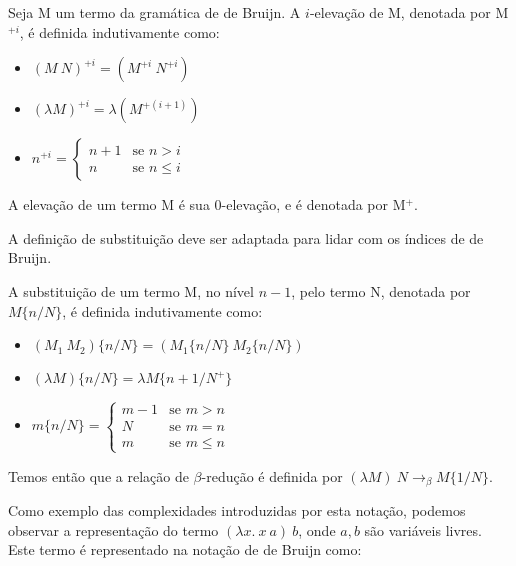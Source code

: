 \begin{definicao}[$i$-elevação] Seja M um termo da gramática de de Bruijn. A
    $i$-elevação de M, denotada por M$^{+i}$, é definida indutivamente como:
    \begin{itemize}
        \item $(M\ N)^{+i} = (M^{+i}\ N^{+i})$
        \item $(\lambda M)^{+i} = \lambda (M^{+(i+1)})$
        \item $n^{+i} = \begin{cases}
                            n + 1   & \text{se } n > i \\
                            n       & \text{se } n \leq i
                        \end{cases}$
    \end{itemize}
    A elevação de um termo M é sua $0$-elevação, e é denotada por M$^+$.
    
\end{definicao}

A definição de substituição deve ser adaptada para lidar com os índices de de
Bruijn.

\begin{definicao} A substituição de um termo M, no nível $n - 1$, pelo termo N,
    denotada por $M\{n/N\}$, é definida indutivamente como:
    \begin{itemize}
        \item $(M_1\ M_2)\{n/N\} = (M_1\{n/N\}\ M_2\{n/N\})$
        \item $(\lambda M)\{n/N\} = \lambda M\{n+1/N^+\}$
        \item $m\{n/N\} = \begin{cases}
                             m - 1 & \text{se } m > n \\
                             N     & \text{se } m = n \\
                             m     & \text{se } m \leq n
                          \end{cases}$
    \end{itemize}
\end{definicao}


\smallskip
Temos então que a relação de $\beta$-redução é definida por $(\lambda M)\ N
\rightarrow_{\beta} M\{1/N\}$.
\smallskip

Como exemplo das complexidades introduzidas por esta notação, podemos observar a
representação do termo $(\lambda x.\ x\ a)\ b$, onde $a,b$ são
variáveis livres. Este termo é representado na notação de de Bruijn como:

